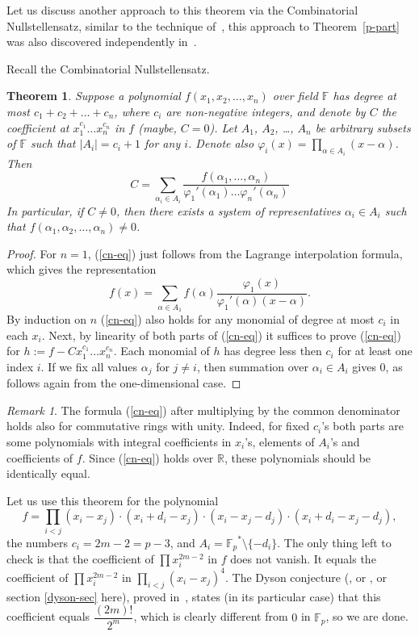 \documentclass[12pt,a4paper]{amsart}
\newtheorem{thm}{Theorem}
\theoremstyle{definition}
\theoremstyle{remark}
\newtheorem*{rem}{Remark}
\begin{document}
Let us discuss another approach to this theorem via the Combinatorial Nullstellensatz, similar to the technique of~\cite{alon2000}, this approach to Theorem~\ref{p-part} was also discovered independently in~\cite{ks2010}.

Recall the Combinatorial Nullstellensatz.

\begin{thm}
\label{cn-prod}
Suppose a polynomial $f(x_1,x_2,\dots,x_n)$ over field $\mathbb{F}$ has degree at most $c_1+c_2+\dots+c_n$, where $c_i$ are non-negative integers, and denote by $C$ the coefficient at $x_1^{c_1}\dots x_n^{c_n}$ in $f$ (maybe, $C=0$). Let $A_1$, $A_2$, \ldots, $A_n$ be arbitrary subsets of $\mathbb{F}$ such that $|A_i|=c_i+1$ for any $i$. Denote also $\varphi_i(x)=\prod_{\alpha\in A_i}(x-\alpha)$. Then
\begin{equation}
\label{cn-eq}
C=\sum_{\alpha_i\in A_i} \frac{f(\alpha_1,\dots,\alpha_n)}
{\varphi_1'(\alpha_1)\dots \varphi_n'(\alpha_n)}
\end{equation}
In particular, if $C\ne 0$, then there exists a system of representatives $\alpha_i\in A_i$ such that $f(\alpha_1,\alpha_2,\dots,\alpha_n)\ne 0$.
\end{thm}

\begin{proof} For $n=1$, (\ref{cn-eq}) just follows from the
Lagrange interpolation formula, which gives the representation
$$
f(x)=\sum_{\alpha\in A_1} f(\alpha)\frac{\varphi_1(x)}{\varphi_1'(\alpha)(x-\alpha)}.
$$
By induction on $n$ (\ref{cn-eq}) also holds for any monomial of degree at most $c_i$ in each $x_i$. Next, by linearity of both parts of (\ref{cn-eq}) it suffices to prove (\ref{cn-eq}) for $h:=f-Cx_1^{c_1}\dots x_n^{c_n}$. Each  monomial of $h$ has degree less then $c_i$ for at least one index $i$. If we fix all values $\alpha_j$ for $j\ne i$, then summation over $\alpha_i\in A_i$ gives 0, as follows again from the one-dimensional case.
\end{proof}

\begin{rem} The formula (\ref{cn-eq}) after multiplying by the common denominator holds also for commutative rings with unity. Indeed, for fixed $c_i$'s both parts are some polynomials with integral coefficients in $x_i$'s, elements of $A_i$'s and coefficients of $f$. Since (\ref{cn-eq}) holds over $\mathbb{R}$, these polynomials should be identically equal.
\end{rem}

Let us use this theorem for the polynomial
$$
f = \prod_{i<j} (x_i-x_j)\cdot (x_i+d_i-x_j)\cdot(x_i-x_j-d_j)\cdot(x_i+d_i-x_j-d_j),
$$
the numbers $c_i=2m-2=p-3$, and $A_i={{\mathbb F_p}}^*\setminus\{-d_i\}$. The only thing left to check is that the coefficient of $\prod x_i^{2m-2}$ in $f$ does not vanish. It equals the coefficient of $\prod x_i^{2m-2}$ in $\prod_{i<j} (x_i-x_j)^4$. The Dyson conjecture (\cite{dyson1962}, or \cite[Theorem~3.2]{alon2000}, or section \ref{dyson-sec} here), proved in~\cite{wilson1962,gunson1962}, states (in its particular case) that this coefficient equals $\dfrac{(2m)!}{2^m}$, which is clearly different from $0$ in ${{\mathbb F_p}}$, so we are done. 
\end{document}
